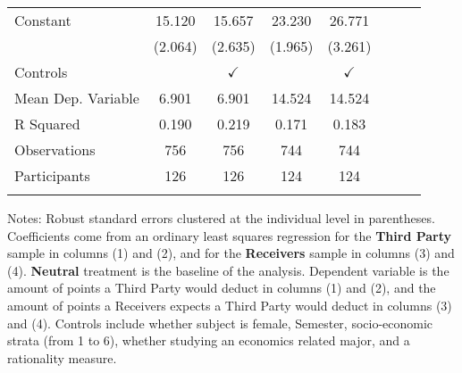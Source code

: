 \begin{table}[H]
{\begin{threeparttable}
\begin{tabular}{lccccccc}
\addlinespace
Constant            &      15.120\sym{***}&      15.657\sym{***}&      23.230\sym{***}&      26.771\sym{***}\\
                    &     (2.064)         &     (2.635)         &     (1.965)         &     (3.261)         \\
\midrule
Controls            &                     &$\checkmark$         &                     &$\checkmark$         \\
\midrule
Mean Dep. Variable  &       6.901         &       6.901         &      14.524         &      14.524         \\
R Squared           &       0.190         &       0.219         &       0.171         &       0.183         \\
Observations        &         756         &         756         &         744         &         744         \\
Participants        &         126         &         126         &         124         &         124         \\
\bottomrule[0.5pt]                                                                               \label{tab:table2}                                                                       \end{tabular}                                                                                                    \vspace{-13pt}                                                                                           \begin{tablenotes}[flushleft]{\setlength{\itemindent}{-3pt}}          \small                                                                                                               \item Notes: Robust standard errors clustered at the individual level in parentheses. Coefficients come from an ordinary least squares regression for the \textbf{Third Party} sample in columns (1) and (2), and for the \textbf{Receivers} sample in columns (3) and (4). \textbf{Neutral} treatment is the baseline of the analysis. Dependent variable is the amount of points a Third Party would deduct in columns (1) and (2), and the amount of points a Receivers expects a Third Party would deduct in columns (3) and (4). Controls include whether subject is female, Semester, socio-economic strata (from 1 to 6), whether studying an economics related major, and a rationality measure.          \end{tablenotes}                                                                                         \end{threeparttable}                                                                             }                                                                                                                        \end{table}
